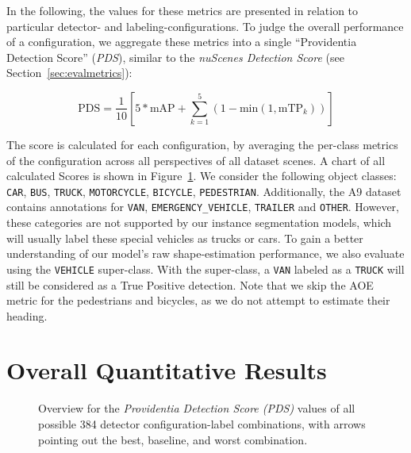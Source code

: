 In the following, the values for these metrics are presented in relation to particular detector- and labeling-configurations.
To judge the overall performance of a configuration, we aggregate these metrics into a single \enquote{Providentia Detection Score} (\textit{PDS}), similar to the \textit{nuScenes Detection Score} (see Section~\ref{sec:evalmetrics}):

\[
    \text{PDS} = \frac{1}{10} \left[5 * \text{mAP} + \sum^5_{k=1}(1-\text{min}(1, \text{mTP}_k))\right]
\]

The score is calculated for each configuration, by averaging the per-class metrics of the configuration across all perspectives of all dataset scenes.
A chart of all calculated Scores is shown in Figure~\ref{fig:all-scores}.
We consider the following object classes: \texttt{CAR}, \texttt{BUS}, \texttt{TRUCK}, \texttt{MOTORCYCLE}, \texttt{BICYCLE}, \texttt{PEDESTRIAN}.
Additionally, the A9 dataset contains annotations for \texttt{VAN}, \texttt{EMERGENCY\_VEHICLE}, \texttt{TRAILER} and \texttt{OTHER}.
However, these categories are not supported by our instance segmentation models, which will usually label these special vehicles as trucks or cars.
To gain a better understanding of our model's raw shape-estimation performance, we also evaluate using the \texttt{VEHICLE} super-class.
With the super-class, a \texttt{VAN} labeled as a \texttt{TRUCK} will still be considered as a True Positive detection.
Note that we skip the AOE metric for the pedestrians and bicycles, as we do not attempt to estimate their heading.


\section{Overall Quantitative Results}
\label{sec:baseline}

\begin{figure}[htb]
    
    \caption{Overview for the \textit{Providentia Detection Score (PDS)} values of all possible 384 detector configuration-label combinations, with arrows pointing out the best, baseline, and worst combination.}
    \label{fig:all-scores}
\end{figure}

